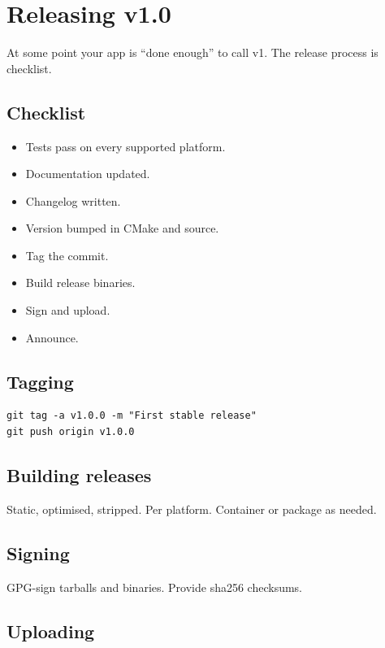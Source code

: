 \chapter{Releasing v1.0}
\label{ch:v1}

\begin{aside}
At some point your app is ``done enough'' to call v1. The
release process is checklist.
\end{aside}

\section{Checklist}

\begin{itemize}[leftmargin=*]
  \item Tests pass on every supported platform.
  \item Documentation updated.
  \item Changelog written.
  \item Version bumped in CMake and source.
  \item Tag the commit.
  \item Build release binaries.
  \item Sign and upload.
  \item Announce.
\end{itemize}

\section{Tagging}

\begin{lstlisting}
git tag -a v1.0.0 -m "First stable release"
git push origin v1.0.0
\end{lstlisting}

\section{Building releases}

Static, optimised, stripped. Per platform. Container or
package as needed.

\section{Signing}

GPG-sign tarballs and binaries. Provide sha256 checksums.

\section{Uploading}

